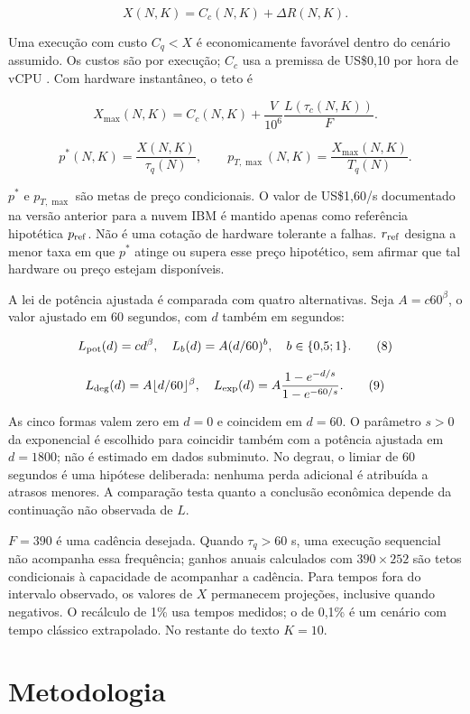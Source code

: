 \documentclass[conference,a4paper]{IEEEtran}
\begin{document}
\[X(N,K)=C_c(N,K)+\Delta R(N,K). \tag{5}\]

Uma execução com custo \(C_q<X\) é economicamente favorável dentro do cenário assumido. Os custos são por execução; \(C_c\) usa a premissa de US\$0,10 por hora de vCPU \cite{aws2026ec2pricing}. Com hardware instantâneo, o teto é

\[X_{\max}(N,K)=C_c(N,K)+\frac{V}{10^6}\frac{L(\tau_c(N,K))}{F}. \tag{6}\]

\[p^*(N,K)=\frac{X(N,K)}{\tau_q(N)},\qquad p_{T,\max}(N,K)=\frac{X_{\max}(N,K)}{T_q(N)}. \tag{7}\]

\(p^*\) e \(p_{T,\max}\) são metas de preço condicionais. O valor de US\$1,60/s documentado na versão anterior para a nuvem IBM \cite{ibm2026pricing} é mantido apenas como referência hipotética \(p_{\rm ref}\). Não é uma cotação de hardware tolerante a falhas. \(r_{\rm ref}\) designa a menor taxa em que \(p^*\) atinge ou supera esse preço hipotético, sem afirmar que tal hardware ou preço estejam disponíveis.

A lei de potência ajustada é comparada com quatro alternativas. Seja \(A=c60^\beta\), o valor ajustado em 60 segundos, com \(d\) também em segundos:

\[L_{\rm pot}(d)=cd^\beta,\quad L_b(d)=A(d/60)^b,\quad b\in\{0{,}5;1\}. \tag{8}\]

\[L_{\rm deg}(d)=A\lfloor d/60\rfloor^\beta,\quad L_{\rm exp}(d)=A\frac{1-e^{-d/s}}{1-e^{-60/s}}. \tag{9}\]

As cinco formas valem zero em \(d=0\) e coincidem em \(d=60\). O parâmetro \(s>0\) da exponencial é escolhido para coincidir também com a potência ajustada em \(d=1800\); não é estimado em dados subminuto. No degrau, o limiar de 60 segundos é uma hipótese deliberada: nenhuma perda adicional é atribuída a atrasos menores. A comparação testa quanto a conclusão econômica depende da continuação não observada de \(L\).

\(F=390\) é uma cadência desejada. Quando \(\tau_q>60\) s, uma execução sequencial não acompanha essa frequência; ganhos anuais calculados com \(390\times252\) são tetos condicionais à capacidade de acompanhar a cadência. Para tempos fora do intervalo observado, os valores de \(X\) permanecem projeções, inclusive quando negativos. O recálculo de 1\% usa tempos medidos; o de 0,1\% é um cenário com tempo clássico extrapolado. No restante do texto \(K=10\).

\section{Metodologia}\label{metodologia}
\end{document}
